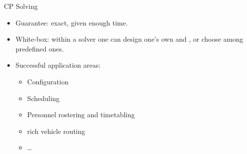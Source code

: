 \documentclass{cons-beamer}
\begin{document}
\begin{frame}{CP Solving}
  \begin{itemize}
    \item Guarantee: exact, given enough time. \vfill
    \item White-box: within a solver one can design one's own 
      and , or choose among predefined ones.
      \vfill
    \item Successful application areas:
      \begin{itemize}
        \item Configuration
        \item Scheduling
        \item Personnel rostering and timetabling
        \item rich vehicle routing
        \item \dots
      \end{itemize}
  \end{itemize}
\end{frame}
\end{document}
